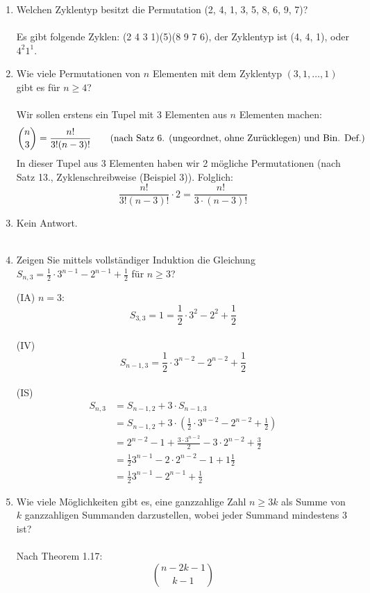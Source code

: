 \begin{enumerate}[label=(\alph*)]
        \item Welchen Zyklentyp besitzt die Permutation (2, 4, 1, 3, 5, 8, 6, 9, 7)?\\\\
        Es gibt folgende Zyklen: (2 4 3 1)(5)(8 9 7 6), der Zyklentyp ist (4, 4, 1), oder $4^2 1^1$.
        \item Wie viele Permutationen von $n$ Elementen mit dem Zyklentyp 
        $(3, 1, \ldots, 1)$ gibt es für $n \geq 4$?\\\\
        Wir sollen erstens ein Tupel mit 3 Elementen aus $n$ Elementen machen: 
        \[
        \binom{n}{3} = \frac{n!}{3!(n-3)!} 
        \textrm{\qquad(nach Satz 6. (ungeordnet, ohne Zur\"ucklegen) und Bin. Def.)}
        \]
        In dieser Tupel aus 3 Elementen haben wir 2 m\"ogliche Permutationen 
        (nach Satz 13., Zyklenschreibweise (Beispiel 3)). Folglich:
        \[\frac{n!}{3!(n-3)!} \cdot 2 = \frac{n!}{3\cdot(n-3)!}\]

        \item Kein Antwort.\\\\
        \item Zeigen Sie mittels vollständiger Induktion die Gleichung $S_{n,3} = \frac{1}{2} \cdot 3^{n-1} - 2^{n-1} + \frac{1}{2}$ für $n \ge 3$?\par
		(IA) $n=3:$ \[ S_{3,3} = 1 = \frac{1}{2} \cdot 3^{2} - 2^{2} + \frac{1}{2}\] \\
		(IV) \[S_{n-1,3} = \frac{1}{2} \cdot 3^{n-2} - 2^{n-2} + \frac{1}{2} \] \\
		(IS)             \begin{align*}
			S_{n,3} &= S_{n-1,2} + 3 \cdot S_{n-1,3} \tag{nach Theorem 1.15}\\
		            &= S_{n-1,2} + 3 \cdot (\frac{1}{2} \cdot 3^{n-2} - 2^{n-2} + \frac{1}{2} )  \tag{nach IV}\\
		            &= 2^{n-2} - 1 + \frac{3 \cdot 3^{n-2}}{2} -3 \cdot 2^{n-2} + \frac{3}{2} \tag{nach der Aufgabe f}\\
		            &= \frac{1}{2} 3^{n-1} - 2 \cdot 2^{n-2} -1 + 1\frac{1}{2} \\
		            &= \frac{1}{2} 3^{n-1} - 2^{n-1} + \frac{1}{2} 
		            		        	  \end{align*}
        \item Wie viele Möglichkeiten gibt es, eine ganzzahlige Zahl $n \ge 3k$ als Summe von $k$ ganzzahligen Summanden darzustellen, wobei jeder Summand mindestens $3$ ist?\\\\
        Nach Theorem 1.17: 
        \[ \binom{n-2k-1}{k-1} \]


\end{enumerate}
